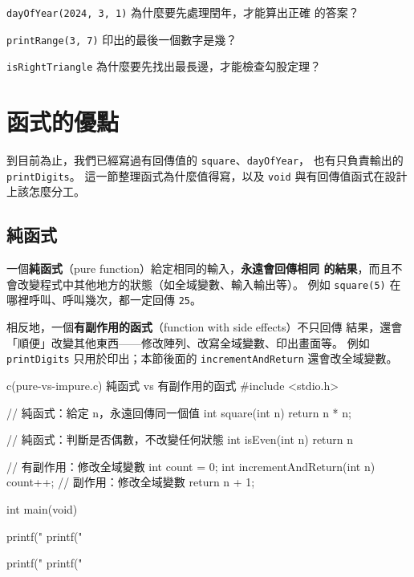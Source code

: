 
\begin{drills}[label=drills:func-params]
\item \texttt{dayOfYear(2024, 3, 1)} 為什麼要先處理閏年，才能算出正確
的答案？
\item \texttt{printRange(3, 7)} 印出的最後一個數字是幾？
\item \texttt{isRightTriangle} 為什麼要先找出最長邊，才能檢查勾股定理？
\end{drills}

\section{函式的優點}
\label{sec:func-benefits}

到目前為止，我們已經寫過有回傳值的 \texttt{square}、\texttt{dayOfYear}，
也有只負責輸出的 \texttt{printDigits}。 這一節整理函式為什麼值得寫，以及
\texttt{void} 與有回傳值函式在設計上該怎麼分工。

\subsection{純函式}

一個\textbf{純函式}（pure function）給定相同的輸入，\textbf{永遠會回傳相同
的結果}，而且不會改變程式中其他地方的狀態（如全域變數、輸入輸出等）。
例如 \texttt{square(5)} 在哪裡呼叫、呼叫幾次，都一定回傳 \texttt{25}。

相反地，一個\textbf{有副作用的函式}（function with side effects）不只回傳
結果，還會「順便」改變其他東西——修改陣列、改寫全域變數、印出畫面等。 例如
\texttt{printDigits} 只用於印出；本節後面的 \texttt{incrementAndReturn} 還會改全域變數。

\begin{example}{c}{(pure-vs-impure.c) 純函式 vs 有副作用的函式}
#include <stdio.h>

// 純函式：給定 n，永遠回傳同一個值
int square(int n) {
    return n * n;
}

// 純函式：判斷是否偶數，不改變任何狀態
int isEven(int n) {
    return n %
}

// 有副作用：修改全域變數
int count = 0;
int incrementAndReturn(int n) {
    count++;  // 副作用：修改全域變數
    return n + 1;
}

int main(void) {
    printf("%
    printf("%

    printf("%
    printf("%
}
\end{example}

